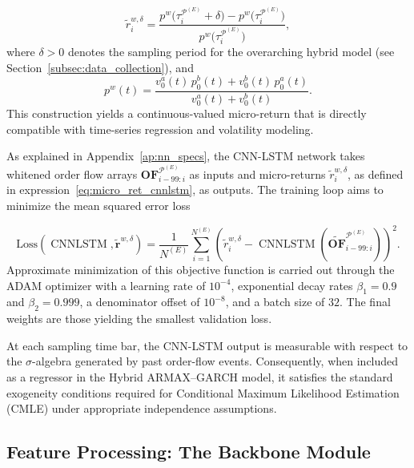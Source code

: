 \documentclass[10pt,a4paper,oneside]{article}
\DeclareMathOperator{\cnnlstm}{CNNLSTM}
\begin{document}
\begin{equation}
    \tilde{r}^{w, \delta}_{i}
    =
    \frac{p^w\bigl(\tau^{\mathcal{P}^{(E)}}_i + \delta\bigr) - p^w\bigl(\tau^{\mathcal{P}^{(E)}}_i\bigr)}{p^w\bigl(\tau^{\mathcal{P}^{(E)}}_i\bigr)},
    \label{eq:micro_ret_cnnlstm}
\end{equation}
where $\delta > 0$ denotes the sampling period for the overarching hybrid model (see Section~\ref{subsec:data_collection}), and
\[
    p^w(t)
    =
    \frac{v^a_0(t)\,p^b_0(t) + v^b_0(t)\,p^a_0(t)}{v^a_0(t) + v^b_0(t)}.
\]
This construction yields a continuous-valued micro-return that is directly compatible with time-series regression and volatility modeling.

As explained in Appendix~\ref{ap:nn_specs}, the CNN-LSTM network takes whitened order flow arrays $\mathbf{OF}^{\mathcal{P}^{(E)}}_{i - 99:i}$ as inputs and micro-returns $\tilde{r}_i^{w, \delta}$, as defined in expression~\eqref{eq:micro_ret_cnnlstm}, as outputs. The training loop aims to minimize the mean squared error loss

\[
    \text{Loss}(\cnnlstm, \tilde{\mathbf{r}}^{w, \delta})
    =
    \frac{1}{N^{(E)}}
    \sum_{i=1}^{N^{(E)}}
    \left(\tilde{r}_i^{w, \delta} - \cnnlstm\left(\widetilde{\mathbf{OF}}^{\mathcal{P}^{(E)}}_{i - 99:i} \right)\right)^2.
\]
Approximate minimization of this objective function is carried out through the ADAM optimizer \cite{kingma2014adam} with a learning rate of \(10^{-4}\), exponential decay rates \(\beta_1 = 0.9\) and \(\beta_2 = 0.999\), a denominator offset of \(10^{-8}\), and a batch size of \(32\). The final weights are those yielding the smallest validation loss.

At each sampling time bar, the CNN-LSTM output is measurable with respect to the $\sigma$-algebra generated by past order-flow events. Consequently, when included as a regressor in the Hybrid ARMAX–GARCH model, it satisfies the standard exogeneity conditions required for Conditional Maximum Likelihood Estimation (CMLE) under appropriate independence assumptions.

\subsection{Feature Processing: The Backbone Module}
\label{subsec:feature_extraction}
\end{document}
